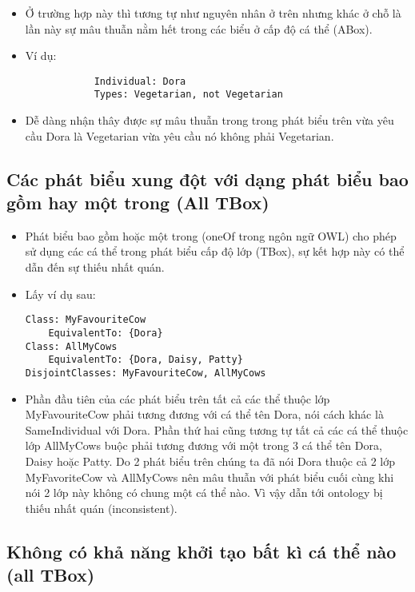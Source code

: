 \begin{itemize} 
\item{Ở trường hợp này thì tương tự như nguyên nhân ở trên nhưng khác ở chỗ là lần này sự mâu thuẫn nằm hết trong các biểu ở cấp độ cá thể (ABox).}
\item{Ví dụ:	
\begin{verbatim}
			Individual: Dora
  			Types: Vegetarian, not Vegetarian
\end{verbatim}
}
\item{Dễ dàng nhận thây được sự mâu thuẫn trong trong phát biểu trên vừa yêu cầu Dora là Vegetarian vừa yêu cầu nó không phải Vegetarian.}
\end{itemize}

\subsection{Các phát biểu xung đột với dạng phát biểu bao gồm hay một trong (All TBox)}

\begin{itemize}
\item 
Phát biểu bao gồm hoặc một trong (oneOf trong ngôn ngữ OWL) cho phép sử dụng các cá thể trong phát biểu cấp độ lớp (TBox), sự kết hợp này có thể dẫn đến sự thiếu nhất quán.
\item
Lấy ví dụ sau:
\begin{verbatim}
Class: MyFavouriteCow
  	EquivalentTo: {Dora}
Class: AllMyCows
  	EquivalentTo: {Dora, Daisy, Patty}
DisjointClasses: MyFavouriteCow, AllMyCows
\end{verbatim}
\item
Phần đầu tiên của các phát biểu trên tất cả các thể thuộc lớp MyFavouriteCow phải tương đương với cá thể tên Dora, nói cách khác là SameIndividual với Dora. Phần thứ hai cũng  tương tự tất cả các cá thể thuộc lớp AllMyCows buộc phải tương đương với một trong 3 cá thể tên Dora, Daisy hoặc Patty. Do 2 phát biểu trên chúng ta đã nói Dora thuộc cả 2 lớp MyFavoriteCow và AllMyCows nên mâu thuẫn với phát biểu cuối cùng khi nói 2 lớp này không có chung một cá thể nào. Vì vậy dẫn tới ontology bị thiếu nhất quán (inconsistent).
\end{itemize}

\subsection{Không có khả năng khởi tạo bất kì cá thể nào (all TBox)}

